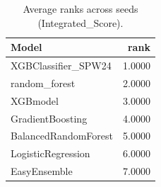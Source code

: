 \begin{table}[t]
\centering
\begin{tabular}{lr}
\toprule
Model & rank \\
\midrule
XGBClassifier_SPW24 & 1.0000 \\
random_forest & 2.0000 \\
XGBmodel & 3.0000 \\
GradientBoosting & 4.0000 \\
BalancedRandomForest & 5.0000 \\
LogisticRegression & 6.0000 \\
EasyEnsemble & 7.0000 \\
\bottomrule
\end{tabular}
\caption{Average ranks across seeds (Integrated_Score).}
\label{tab:avg_rank_Integrated_Score}
\end{table}